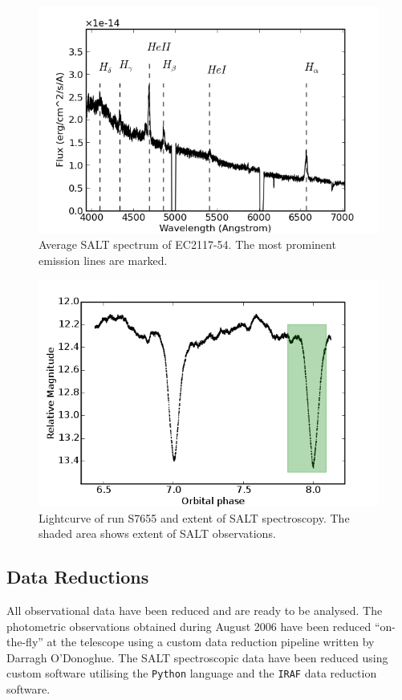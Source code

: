 \documentclass[a4paper,10pt]{article}
\begin{document}
\begin{figure}
 \centering
 \includegraphics[bb=0 0 600 400,width=0.8\columnwidth]{../images/EC2117.png}
 \caption{Average SALT spectrum of EC2117-54. The most prominent emission lines are marked.}
 \label{average_spec}
\end{figure}

\begin{figure}
 \centering
 \includegraphics[bb=0 0 600 400,width=0.8\columnwidth]{../images/S7655_SALT_coverage.png}
 \caption{Lightcurve of run S7655 and extent of SALT spectroscopy. The shaded area shows extent of SALT observations.}
 \label{SALT_Coverage}
\end{figure}


\subsection{Data Reductions}

All observational data have been reduced and are ready to be analysed. The photometric observations obtained during August 2006 have been reduced ``on-the-fly'' at the telescope using a custom data reduction pipeline written by Darragh O'Donoghue. The SALT spectroscopic data have been reduced using custom software utilising the \texttt{Python} language and the \texttt{IRAF} data reduction software.
\end{document}
